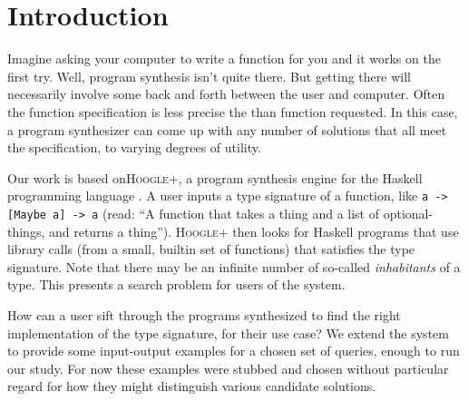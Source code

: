 \section{Introduction}

Imagine asking your computer to write a function for you and it works on the
first try.
%
Well, program synthesis isn't quite there.
%
But getting there will necessarily involve some back and forth between the user
and computer.
%
Often the function specification is less precise the than function requested.
%
In this case, a program synthesizer can come up with any number of solutions
that all meet the specification, to varying degrees of utility.

Our work is based on\textsc{Hoogle+}, a program synthesis engine for the
Haskell programming language \cite{hoogle_plus_2020}.
%
A user inputs a type signature of a function, like \texttt{a -> [Maybe a] -> a}
(read: ``A function that takes a thing and a list of optional-things, and
returns a thing'').
%
\textsc{Hoogle+} then looks for Haskell programs that use library calls (from
a small, builtin set of functions) that satisfies the type signature.
%
Note that there may be an infinite number of so-called \emph{inhabitants} of a type.
%
This presents a search problem for users of the system.

How can a user sift through the programs synthesized to find the right
implementation of the type signature, for their use case?
%
We extend the system to provide some input-output examples for a chosen set of
queries, enough to run our study.
%
For now these examples were stubbed and chosen without particular regard for how
they might distinguish various candidate solutions.
%

